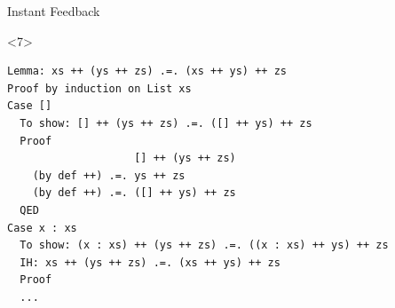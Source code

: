 \documentclass[aspectratio=169]{beamer}
\begin{document}
\begin{frame}[fragile]{Instant Feedback}

\begin{onlyenv}<7>
\begin{lstlisting}
Lemma: xs ++ (ys ++ zs) .=. (xs ++ ys) ++ zs
Proof by induction on List xs
Case []
  To show: [] ++ (ys ++ zs) .=. ([] ++ ys) ++ zs
  Proof
                    [] ++ (ys ++ zs)
    (by def ++) .=. ys ++ zs
    (by def ++) .=. ([] ++ ys) ++ zs
  QED
Case x : xs
  To show: (x : xs) ++ (ys ++ zs) .=. ((x : xs) ++ ys) ++ zs
  IH: xs ++ (ys ++ zs) .=. (xs ++ ys) ++ zs
  Proof
  ...
\end{lstlisting}
\end{onlyenv}

\end{frame}
\end{document}
